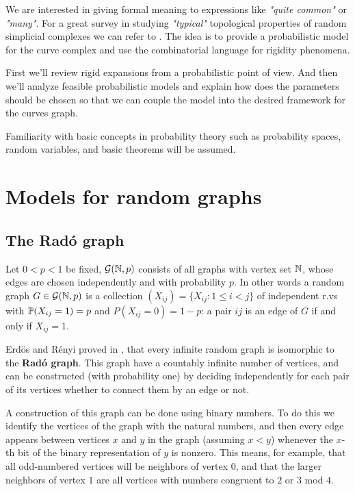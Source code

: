 We are interested in giving formal meaning to expressions like \textit{"quite common"} or \textit{"many"}. For a great survey in studying \textit{"typical"} topological properties of random simplicial complexes we can refer to \cite[M. Khale]{surveyStochastic}. The idea is to provide a probabilistic model for the curve complex and use the combinatorial language for rigidity phenomena. 

First we'll review rigid expansions from a probabilistic point of view. And then we'll analyze feasible probabilistic models and explain how does the parameters should be chosen so that we can couple the model into the desired framework for the curves graph. 

Familiarity with basic concepts in probability theory such as probability spaces, random variables, and basic theorems will be assumed.

\section{Models for random graphs}
\subsection{The Radó graph}

Let $0 < p < 1$ be fixed, $\G(\N, p)$ consists of all graphs with vertex set $\N$, whose edges are chosen independently and with probability $p$. In other words a random graph $G \in \G(\N,p)$ is a collection $(X_{ij}) = \{ X_{ij} : 1 \leq i < j\}$ of independent r.vs with $\P(X_{ij} = 1) = p$ and $P(X_{ij} = 0) = 1-p$: a pair $ij$ is an edge of $G$ if and only if $X_{ij} = 1$.

Erdös and Rényi proved in \cite[Erdös, Rényi]{RadoUnique}, that every infinite random graph is isomorphic to the \textbf{Radó graph}. This graph have a countably infinite number of vertices, and can be constructed (with probability one) by deciding independently for each pair of its vertices whether to connect them by an edge or not.

A construction of this graph can be done using binary numbers. To do this we identify the vertices of the graph with the natural numbers, and then every edge appears between vertices $x$ and $y$ in the graph (assuming $x < y$) whenever the $x$-th bit of the binary representation of $y$ is nonzero. This means, for example, that all odd-numbered vertices will be neighbors of vertex $0$, and that the larger neighbors of vertex $1$ are all vertices with numbers congruent to $2$ or $3$ mod $4$.

